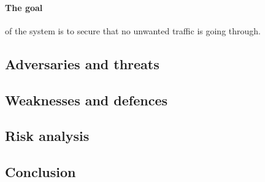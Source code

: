 \paragraph{The goal} of the system is to secure that no unwanted traffic is
going through.

\subsection{Adversaries and threats}

\subsection{Weaknesses and defences}

\subsection{Risk analysis}

\subsection{Conclusion}
